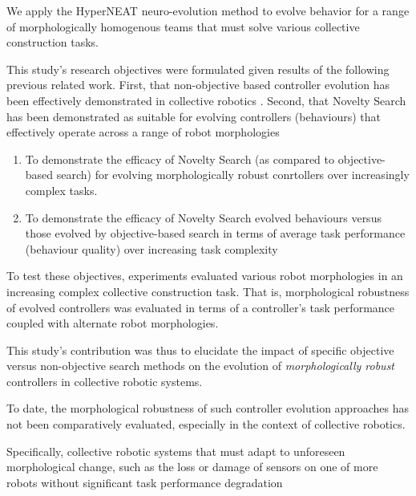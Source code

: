 We apply the HyperNEAT \cite{StanleyDAmbrosioGauci2009} neuro-evolution method to evolve
behavior for a range of morphologically homogenous teams that must solve various collective construction tasks.

This study's research objectives were formulated given results of the following previous related work. First, that non-objective based controller evolution has been effectively demonstrated in collective robotics \cite{RefWorks:11, gomes2013generic, RefWorks:5}.
Second, that Novelty Search has been demonstrated as suitable for evolving controllers (behaviours) that effectively operate across a range of robot morphologies






\begin{enumerate}
	\item To demonstrate the efficacy of Novelty Search (as compared to objective-based search) for evolving morphologically robust conrtollers over increasingly complex tasks.
	\item To demonstrate the efficacy of Novelty Search evolved behaviours versus those evolved by objective-based search in terms of average task performance (behaviour quality) over increasing task complexity
\end{enumerate}

To test these objectives, experiments evaluated various robot morphologies in an increasing complex collective construction task. 
That is, morphological robustness of evolved controllers was evaluated in terms of a controller's task performance coupled with alternate robot morphologies.

This study's contribution was thus to elucidate the impact of specific objective versus non-objective search methods on the evolution of \textit{morphologically robust} controllers in collective robotic systems. 

To date, the morphological robustness of such controller evolution approaches has not been comparatively evaluated, especially in the context of collective robotics. 

Specifically, collective robotic systems that must adapt to unforeseen morphological change, such as the loss or damage of sensors on one of more robots without significant task performance degradation \cite{BongardZykovLipson2006} \cite{CullyCluneTaraporeMouret2015}


